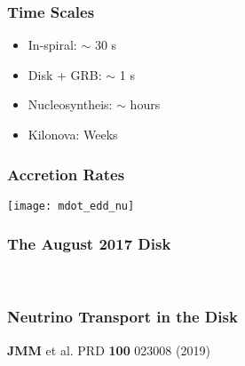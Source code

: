 \documentclass[]{beamer}
\begin{document}
\begin{frame}
  \frametitle{Time Scales}
  \begin{itemize}
  \item In-spiral: $\sim$ 30 s
  \item Disk + GRB: $\sim$ 1 s
  \item Nucleosyntheis: $\sim$ hours
  \item Kilonova: Weeks
  \end{itemize}
\end{frame}

\begin{frame}
  \frametitle{Accretion Rates}
  \begin{center}
    \texttt{[image: mdot\_edd\_nu]}
  \end{center}
\end{frame}

\begin{frame}
  \frametitle{The August 2017 Disk}
  \begin{center}
     \\
  \end{center}
\end{frame}

\begin{frame}
  \frametitle{Neutrino Transport in the Disk}
  \begin{center}
  \end{center}
  \begin{tiny}
    \textbf{JMM} et al. PRD \textbf{100} 023008 (2019)
  \end{tiny}
\end{frame}
\end{document}
